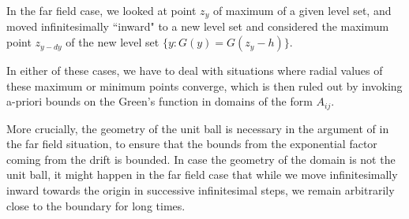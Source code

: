 \documentclass{article}
\theoremstyle{plain}
\theoremstyle{definition}
\theoremstyle{plain}
\begin{document}
In the far field case, we looked at point $z_y$ of maximum of a given level set, and moved infinitesimally ``inward" to a new level set and considered the maximum point $z_{y-dy}$ of the new level set $\{y : G(y) = G(z_y - h)\}$.

In either of these cases, we have to deal with situations where radial values of these maximum or minimum points converge, which is then ruled out by invoking a-priori bounds on the Green's function  in domains of the form $A_{ij}$.

More crucially, the geometry of the unit ball is necessary in the argument of \cite{Pat25} in the far field situation, to ensure that the bounds from the exponential factor coming from the drift is bounded. In case the geometry of the domain is not the unit ball, it might happen in the far field case that while we move infinitesimally inward towards the origin in successive infinitesimal steps, we remain arbitrarily close to the boundary for long times.

\end{document}
